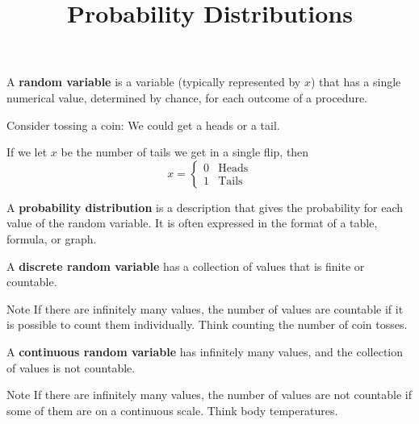 \documentclass{beamer}
\title[MA205 - Section 5.1]{Probability Distributions}
\begin{document}
\begin{frame}
\titlepage
\end{frame}

\begin{frame}
\begin{definition}
A \textbf{random variable} is a variable (typically represented by $x$) that has a single numerical value, determined by chance, for each outcome of a procedure.
\end{definition}\pause

\begin{example}
Consider tossing a coin: We could get a heads or a tail.

\vspace{1mm}
If we let $x$ be the number of tails we get in a single flip, then
\begin{equation*}
x=
\begin{cases}
0 & \text{Heads} \\
1 & \text{Tails}
\end{cases}
\end{equation*}
\end{example}\pause

\begin{definition}
A \textbf{probability distribution} is a description that gives the probability for each value of the random variable. It is often expressed in the format of a table, formula, or graph.
\end{definition}
\end{frame}

\begin{frame}
\begin{definition}
A \textbf{discrete random variable} has a collection of values that is finite or countable.
\end{definition}\pause

\begin{block}{Note}
If there are infinitely many values, the number of values are countable if it is possible to count them individually. Think counting the number of coin tosses.
\end{block}\pause

\begin{definition}
A \textbf{continuous random variable} has infinitely many values, and the collection of values is not countable.
\end{definition}\pause

\begin{block}{Note}
If there are infinitely many values, the number of values are not countable if some of them are on a continuous scale. Think body temperatures.
\end{block}\pause
\end{frame}
\end{document}
